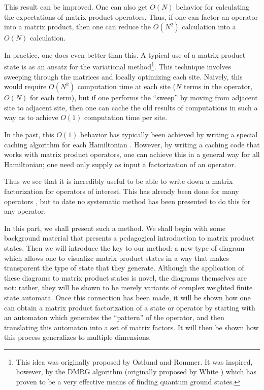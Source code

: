 \documentclass[12pt]{amsbook}
\theoremstyle{plain}
\theoremstyle{definition}
\theoremstyle{remark}
\begin{document}
This result can be improved.  One can also get $O(N)$ behavior for calculating the expectations of matrix product operators.  Thus, if one can factor an operator into a matrix product, then one can reduce the $O(N^2)$ calculation into a $O(N)$ calculation.

In practice, one does even better than this.  A typical use of a matrix product state is as an ansatz for the variational method\footnote{This idea was originally proposed by Ostlund and Rommer\cite{Ostlund:1995uq}.  It was inspired, however, by the DMRG algorithm (originally proposed by White \cite{White:1992ys}) which has proven to be a very effective means of finding quantum ground states.}.  This technique involves sweeping through the matrices and locally optimizing each site.  Naively, this would require $O(N^2)$ computation time at each site ($N$ terms in the operator, $O(N)$ for each term), but if one performs the ``sweep'' by moving from adjacent site to adjacent site, then one can cache the old results of computations in such a way as to achieve $O(1)$ computation time per site.

In the past, this $O(1)$ behavior has typically been achieved by writing a special caching algorithm for each Hamiltonian \cite{cond-mat/0404706}.  However, by writing a caching code that works with matrix product operators, one can achieve this in a general way for all Hamiltonian;  one need only supply as input a factorization of an operator.

Thus we see that it is incredibly useful to be able to write down a matrix factorization for operators of interest.  This has already been done for many operators \cite{cond-mat/0701428}, but to date no systematic method has been presented to do this for any operator.

In this part, we shall present such a method.  We shall begin with some background material that presents a pedagogical introduction to matrix product states.  Then we will introduce the key to our method:  a new type of diagram which allows one to visualize matrix product states in a way that makes transparent the type of state that they generate.  Although the application of these diagrams to matrix product states is novel, the diagrams themselves are not:  rather, they will be shown to be merely variants of complex weighted finite state automata.  Once this connection has been made, it will be shown how one can obtain a matrix product factorization of a state or operator by starting with an automaton which generates the ``pattern'' of the operator, and then translating this automaton into a set of matrix factors.  It will then be shown how this process generalizes to multiple dimensions.
\end{document}
